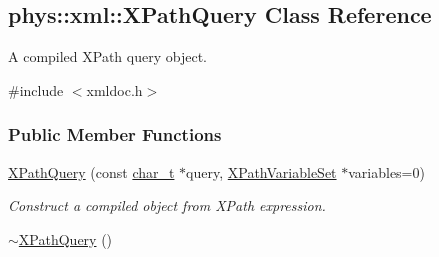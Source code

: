 \hypertarget{classphys_1_1xml_1_1XPathQuery}{
\subsection{phys::xml::XPathQuery Class Reference}
\label{de/d52/classphys_1_1xml_1_1XPathQuery}
}


A compiled XPath query object.  




{\ttfamily \#include $<$xmldoc.h$>$}

\subsubsection*{Public Member Functions}
\begin{DoxyCompactItemize}
\item 
\hyperlink{classphys_1_1xml_1_1XPathQuery_a1a63135370ef4999f3dd27540c9009a2}{XPathQuery} (const \hyperlink{namespacephys_1_1xml_afc87705cd1c2917d87b879715a2d8f6e}{char\_\-t} $\ast$query, \hyperlink{classphys_1_1xml_1_1XPathVariableSet}{XPathVariableSet} $\ast$variables=0)
\begin{DoxyCompactList}\small\item\em Construct a compiled object from XPath expression. \item\end{DoxyCompactList}\item 
\hypertarget{classphys_1_1xml_1_1XPathQuery_a063a1c4513d62695ae73c981f2050dc4}{
\hyperlink{classphys_1_1xml_1_1XPathQuery_a063a1c4513d62695ae73c981f2050dc4}{$\sim$XPathQuery} ()}
\label{de/d52/classphys_1_1xml_1_1XPathQuery_a063a1c4513d62695ae73c981f2050dc4}


\end{DoxyCompactItemize}
